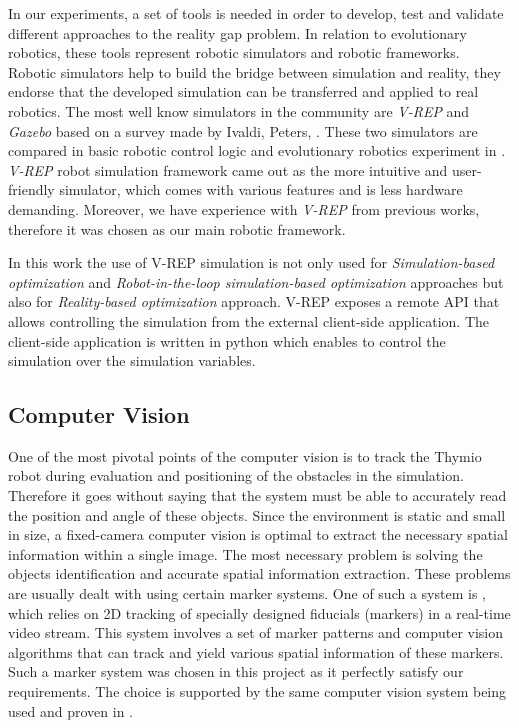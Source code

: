 In our experiments, a set of tools is needed in order to develop, test and validate different approaches to the reality gap problem. In relation to evolutionary robotics, these tools represent robotic simulators and robotic frameworks. Robotic simulators help to build the bridge between simulation and reality, they endorse that the developed simulation can be transferred and applied to real robotics. The most well know simulators in the community are \emph{V-REP} \citep{rohmer2013v} and \emph{Gazebo} \citep{koenig2004design} based on a survey made by Ivaldi, Peters, \citep{ivaldi2014tools}. These two simulators are compared in basic robotic control logic and evolutionary robotics experiment in \citep{nogueira2014comparative}. \emph{V-REP} robot simulation framework came out as the more intuitive and user-friendly simulator, which comes with various features and is less hardware demanding. Moreover, we have experience with \emph{V-REP} from previous works, therefore it was chosen as our main robotic framework.

In this work the use of V-REP simulation is not only used for \emph{Simulation-based optimization} and \emph{Robot-in-the-loop simulation-based optimization} approaches but also for \emph{Reality-based optimization} approach. V-REP exposes a remote API that allows controlling the simulation from the external client-side application. The client-side application is written in python which enables to control the simulation over the simulation variables.

\subsection{Computer Vision}

One of the most pivotal points of the computer vision is to track the Thymio robot during evaluation and positioning of the obstacles in the simulation. Therefore it goes without saying that the system must be able to accurately read the position and angle of these objects. Since the environment is static and small in size, a fixed-camera computer vision is optimal to extract the necessary spatial information within a single image. The most necessary problem is solving the objects identification and accurate spatial information extraction. These problems are usually dealt with using certain marker systems. One of such a system is \citep{bencina2005improved}, which relies on 2D tracking of specially designed fiducials (markers) in a real-time video stream. This system involves a set of marker patterns and computer vision algorithms that can track and yield various spatial information of these markers. Such a marker system was chosen in this project as it perfectly satisfy our requirements. The choice is supported by the same computer vision system being used and proven in \citep{faina2017automating}.

